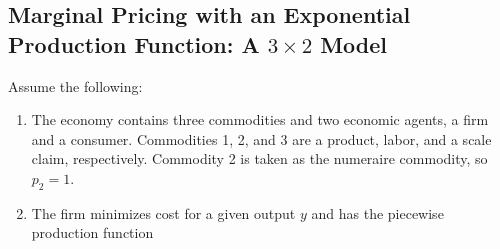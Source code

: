 \documentclass[
  letterpaper,
  DIV=11,
  numbers=noendperiod]{scrreprt}
\newenvironment{Shaded}{\begin{snugshade}}{\end{snugshade}}
\newcommand{\ConstantTok}[1]{\textcolor[rgb]{0.56,0.35,0.01}{#1}}
\newcommand{\FloatTok}[1]{\textcolor[rgb]{0.68,0.00,0.00}{#1}}
\newcommand{\FunctionTok}[1]{\textcolor[rgb]{0.28,0.35,0.67}{#1}}
\newcommand{\NormalTok}[1]{\textcolor[rgb]{0.00,0.23,0.31}{#1}}
\newcommand{\OperatorTok}[1]{\textcolor[rgb]{0.37,0.37,0.37}{#1}}
\begin{document}
%

\subsection{\texorpdfstring{Marginal Pricing with an Exponential
Production Function: A \(3\times2\)
Model}{Marginal Pricing with an Exponential Production Function: A 3\textbackslash times2 Model}}\label{marginal-pricing-with-an-exponential-production-function-a-3times2-model}

Assume the following:

\begin{enumerate}
\def\labelenumi{\arabic{enumi}.}
\item
  The economy contains three commodities and two economic agents, a firm
  and a consumer. Commodities 1, 2, and 3 are a product, labor, and a
  scale claim, respectively. Commodity 2 is taken as the numeraire
  commodity, so \(p_2=1\).
\item
  The firm minimizes cost for a given output \(y\) and has the piecewise
  production function
\end{enumerate}
\end{document}
